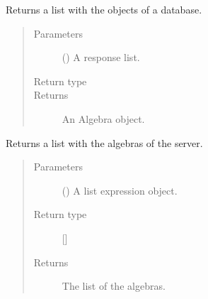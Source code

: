 \documentclass[letterpaper,10pt,english]{sphinxmanual}
\begin{document}

\begin{fulllineitems}
\label{\detokenize{index:secondodb.api.support.secondoparser.parse_inquiry_algebra}}
Returns a list with the objects of a database.
\begin{quote}\begin{description}
\item[{Parameters}] \leavevmode
{} () \textendash{} A response list.

\item[{Return type}] \leavevmode
{}

\item[{Returns}] \leavevmode
An Algebra object.

\end{description}\end{quote}

\end{fulllineitems}


\begin{fulllineitems}
\label{\detokenize{index:secondodb.api.support.secondoparser.parse_inquiry_algebras}}
Returns a list with the algebras of the server.
\begin{quote}\begin{description}
\item[{Parameters}] \leavevmode
{} () \textendash{} A list expression object.

\item[{Return type}] \leavevmode
{[}{]}

\item[{Returns}] \leavevmode
The list of the algebras.

\end{description}\end{quote}

\end{fulllineitems}
\end{document}

